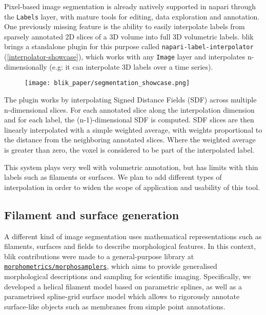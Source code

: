 Pixel-based image segmentation is already natively supported in napari through the \texttt{Labels} layer, with mature tools for editing, data exploration and annotation. One previously missing feature is the ability to easily interpolate labels from sparsely annotated 2D slices of a 3D volume into full 3D volumetric labels. blik brings a standalone plugin for this purpose called \texttt{napari-label-interpolator} (\autoref{interpolator-showcase}), which works with any \texttt{Image} layer and interpolates n-dimensionally (e.g: it can interpolate 3D labels over a time series).

\begin{figure}[!ht]
    \centering
    \texttt{[image: blik\_paper/segmentation\_showcase.png]}
    \label{interpolator-showcase}
\end{figure}

The plugin works by interpolating Signed Distance Fields (SDF) across multiple n-dimensional slices. For each annotated slice along the interpolation dimension and for each label, the (n-1)-dimensional SDF is computed. SDF slices are then linearly interpolated with a simple weighted average, with weights proportional to the distance from the neighboring annotated slices. Where the weighted average is greater than zero, the voxel is considered to be part of the interpolated label.

This system plays very well with volumetric annotation, but has limits with thin labels such as filaments or surfaces. We plan to add different types of interpolation in order to widen the scope of application and usability of this tool.

\subsection{Filament and surface generation}\label{filament-and-surface-generation}

A different kind of image segmentation uses mathematical representations such as filaments, surfaces and fields to describe morphological features. In this context, blik contributions were made to a general-purpose library at \href{https://github.com/morphometrics/morphosamplers}{\texttt{morphometrics\-/\-morphosamplers}}, which aims to provide generalised morphological descriptions and sampling for scientific imaging. Specifically, we developed a helical filament model based on parametric splines, as well as a parametrised spline-grid surface model which allows to rigorously annotate surface-like objects such as membranes from simple point annotations.

